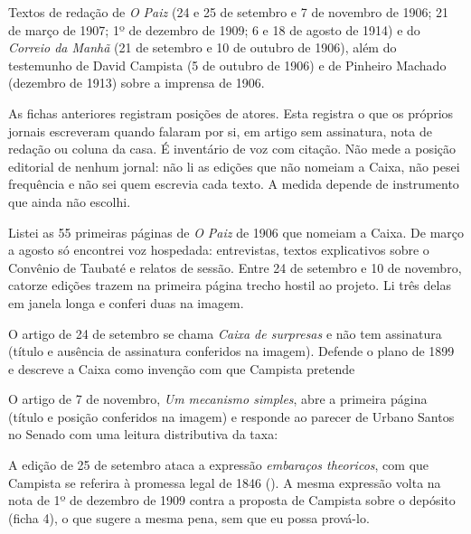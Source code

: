 

Textos de redação de \textit{O Paiz} (24 e 25 de setembro e 7 de novembro de
1906; 21 de março de 1907; 1º de dezembro de 1909; 6 e 18 de agosto de 1914) e
do \textit{Correio da Manhã} (21 de setembro e 10 de outubro de 1906), além do
testemunho de David Campista (5 de outubro de 1906) e de Pinheiro Machado
(dezembro de 1913) sobre a imprensa de 1906.


As fichas anteriores registram posições de atores. Esta registra o que os
próprios jornais escreveram quando falaram por si, em artigo sem assinatura,
nota de redação ou coluna da casa. É inventário de voz com citação. Não mede a
posição editorial de nenhum jornal: não li as edições que não nomeiam a Caixa,
não pesei frequência e não sei quem escrevia cada texto. A medida depende de
instrumento que ainda não escolhi.


Listei as 55 primeiras páginas de \textit{O Paiz} de 1906 que nomeiam a Caixa.
De março a agosto só encontrei voz hospedada: entrevistas, textos explicativos
sobre o Convênio de Taubaté e relatos de sessão. Entre 24 de setembro e 10 de
novembro, catorze edições trazem na primeira página trecho hostil ao projeto.
Li três delas em janela longa e conferi duas na imagem.

O artigo de 24 de setembro se chama \textit{Caixa de surpresas} e não tem
assinatura (título e ausência de assinatura conferidos na imagem). Defende o
plano de 1899 e descreve a Caixa como invenção com que Campista pretende


O artigo de 7 de novembro, \textit{Um mecanismo simples}, abre a primeira
página (título e posição conferidos na imagem) e responde ao parecer de Urbano
Santos no Senado com uma leitura distributiva da taxa:


A edição de 25 de setembro ataca a expressão \textit{embaraços theoricos}, com
que Campista se referira à promessa legal de 1846
(). A mesma expressão volta na nota
de 1º de dezembro de 1909 contra a proposta de Campista sobre o depósito (ficha
4), o que sugere a mesma pena, sem que eu possa prová-lo.

